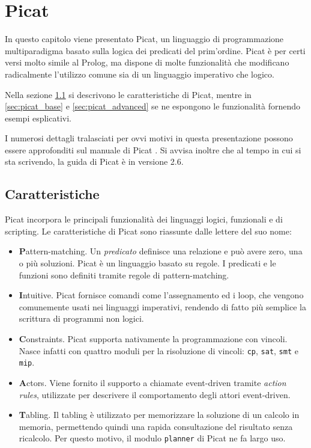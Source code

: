 \documentclass[12pt,a4paper,openright]{book}  %
\begin{document}
\chapter{Picat}
\label{ch:picat}


In questo capitolo viene presentato Picat, un linguaggio di
programmazione multiparadigma basato sulla logica dei predicati del
prim'ordine. Picat è per certi versi molto simile al Prolog, ma
dispone di molte funzionalità che modificano radicalmente l'utilizzo
comune sia di un linguaggio imperativo che logico.

Nella sezione \ref{sec:picat_features} si descrivono le
caratteristiche di Picat, mentre in \ref{sec:picat_base} e
\ref{sec:picat_advanced} se ne espongono le funzionalità fornendo
esempi esplicativi.

I numerosi dettagli tralasciati per ovvi motivi in questa
presentazione possono essere approfonditi sul manuale di Picat
\cite{PicatGuide}. Si avvisa inoltre che al tempo in cui si sta
scrivendo, la guida di Picat è in versione 2.6.

\section{Caratteristiche}
\label{sec:picat_features}

Picat incorpora le principali funzionalità dei linguaggi logici,
funzionali e di scripting. Le caratteristiche di Picat sono riassunte
dalle lettere del suo nome:
\begin{itemize}
\item \textbf{P}attern-matching. Un \emph{predicato} definisce una
  relazione e può avere zero, una o più soluzioni. Picat è un
  linguaggio basato su regole. I predicati e le funzioni sono definiti
  tramite regole di pattern-matching.
\item \textbf{I}ntuitive. Picat fornisce comandi come l'assegnamento
  ed i loop, che vengono comunemente usati nei linguaggi imperativi,
  rendendo di fatto più semplice la scrittura di programmi non logici.
\item \textbf{C}onstraints. Picat supporta nativamente la programmazione con
  vincoli. Nasce infatti con quattro moduli per la risoluzione di
  vincoli: \verb|cp|, \verb|sat|, \verb|smt| e \verb|mip|.
\item \textbf{A}ctors. Viene fornito il supporto a chiamate
  event-driven tramite \emph{action rules}, utilizzate per descrivere
  il comportamento degli attori event-driven.
\item \textbf{T}abling. Il tabling è utilizzato per memorizzare la
  soluzione di un calcolo in memoria, permettendo quindi una rapida
  consultazione del risultato senza ricalcolo. Per questo motivo, il
  modulo \verb|planner| di Picat ne fa largo uso.
\end{itemize}
\end{document}
